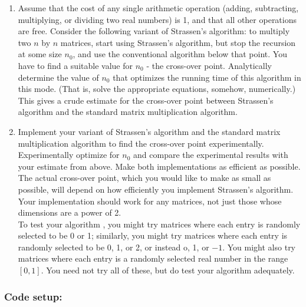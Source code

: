 \documentclass[tikz, 12pt]{scrartcl}
\begin{document}
\begin{enumerate}
	\item Assume that the cost of any single arithmetic operation (adding, subtracting, multiplying, or dividing two real numbers) is 1, and that all other operations are free. Consider the following variant of Strassen's algorithm: to multiply two $n$ by $n$ matrices, start using Strassen's algorithm, but stop the recursion at some size $n_0$, and use the conventional algorithm below that point. You have to find a suitable value for $n_0$ - the cross-over point. Analytically determine the value of $n_0$ that optimizes the running time of this algorithm in this mode. (That is, solve the appropriate equations, somehow, numerically.) This gives a crude estimate for the cross-over point between Strassen's algorithm and the standard matrix multiplication algorithm.
	\item Implement your variant of Strassen's algorithm and the standard matrix multiplication algorithm to find the cross-over point experimentally. Experimentally optimize for $n_0$ and compare the experimental results with your estimate from above. Make both implementations as efficient as possible.\\
	The actual cross-over point, which you would like to make as small as possible, will depend on how efficiently you implement Strassen's algorithm. Your implementation should work for any matrices, not just those whose dimensions are a power of 2.\\
	To test your algorithm , you might try matrices where each entry is randomly selected to be 0 or 1; similarly, you might try matrices where each entry is randomly selected to be 0, 1, or 2, or instead o, 1, or $-1$. You might also try matrices where each entry is a randomly selected real number in the range $[0, 1]$. You need not try all of these, but do test your algorithm adequately.
\end{enumerate}

\subsubsection*{Code setup:}
\end{document}
